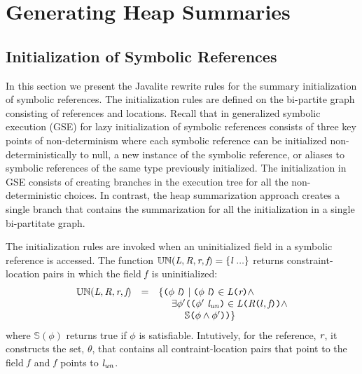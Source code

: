 \section{Generating Heap Summaries}

\subsection{Initialization of Symbolic References}

In this section we present the Javalite rewrite rules for the summary
initialization of symbolic references. The initialization rules are
defined on the bi-partite graph consisting of references and
locations. Recall that in generalized symbolic execution (GSE) for
lazy initialization of symbolic references consists of three key
points of non-determinism where each symbolic reference can be
initialized non-deterministically to null, a new instance of the
symbolic reference, or aliases to symbolic references of the same type
previously initialized. The initialization in GSE consists of creating
branches in the execution tree for all the non-deterministic
choices. In contrast, the heap summarization approach creates a
single branch that contains the summarization for all the
initialization in a single bi-partitate graph.




The initialization rules are invoked when an uninitialized field in a
symbolic reference is accessed. The function $\mathbb{UN}(\emph{L},
\emph{R}, \emph{r}, \emph{f}) = \{\emph{l}\ ...\}$ returns
constraint-location pairs in which the field $\emph{f}$ is
uninitialized:
\[
\begin{array}{rcl}
\mathbb{UN}(\cfgnt{L}, \cfgnt{R}, \cfgnt{r}, \cfgnt{f}) & = &\{ \lp\phi\ \cfgnt{l}\rp \mid \lp \phi\ \cfgnt{l}\rp  \in \cfgnt{L}\lp \cfgnt{r}\rp  \wedge \\
& & \ \ \ \ \exists \phi^\prime \lp \lp \phi^\prime\ \cfgnt{l}_\mathit{un}\rp  \in \cfgnt{L}\lp \cfgnt{R}\lp l,\cfgnt{f}\rp\rp \wedge \\
& & \ \ \ \ \ \ \ \ \mathbb{S}\lp \phi \wedge \phi^\prime \rp\rp\}\\
\end{array}
\]
where $\mathbb{S}(\phi)$ returns true if $\phi$ is
satisfiable. Intutively, for the reference, $\emph{r}$, it constructs
the set, $\theta$, that contains all contraint-location pairs that
point to the field $\emph{f}$ and $\emph{f}$ points to
$\emph{l}_\mathit{un}$.

